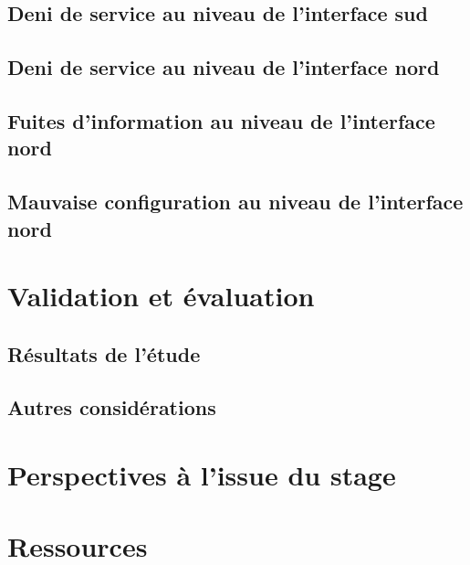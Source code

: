 \documentclass[a4paper]{article}
\begin{document}
	\subsection{Deni de service au niveau de l'interface sud}
	\subsection{Deni de service au niveau de l'interface nord}
	\subsection{Fuites d'information au niveau de l'interface nord}
	\subsection{Mauvaise configuration au niveau de l'interface nord}
\section{Validation et évaluation}
	\subsection{Résultats de l'étude}
	\subsection{Autres considérations}
\section{Perspectives à l'issue du stage}
\section{Ressources}


~

\newpage

\nocite{*}



\end{document}
